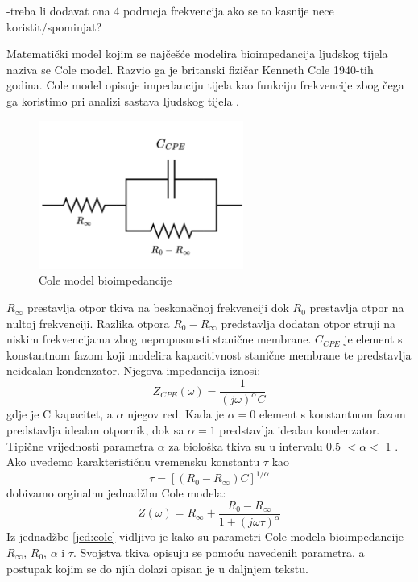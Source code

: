 \documentclass[../diplomski_rad.tex]{subfiles}
\begin{document}
-treba li dodavat ona 4 podrucja frekvencija ako se to kasnije nece koristit/spominjat?

Matematički model kojim se najčešće modelira bioimpedancija ljudskog tijela naziva se Cole model. 
Razvio ga je britanski fizičar Kenneth Cole 1940-tih godina. 
Cole model opisuje impedanciju tijela kao funkciju frekvencije zbog čega ga koristimo pri analizi sastava ljudskog tijela \cite{Freeborn2021}.
\begin{figure}[htb]
    \centering
    \includegraphics[width=0.6\textwidth]{Figures/cole_model.png} 
    \caption{Cole model bioimpedancije}
    \label{slk:cole_model}
\end{figure}
$R_{\infty}$ prestavlja otpor tkiva na beskonačnoj frekvenciji dok $R_{0}$ prestavlja otpor na nultoj frekvenciji. 
Razlika otpora $R_{0}-R_{\infty}$ predstavlja dodatan otpor struji na niskim frekvencijama zbog nepropusnosti stanične membrane. 
$C_{CPE}$ je element s konstantnom fazom koji modelira kapacitivnost stanične membrane 
te predstavlja neidealan kondenzator. Njegova impedancija iznosi: 
\begin{equation}
    \label{jed:cpe}
    Z_{CPE}(\omega) = \frac{1}{(j\omega)^{\alpha}C}
\end{equation} 
gdje je C kapacitet, a $\alpha$ njegov red. Kada je $\alpha = 0$ element s konstantnom fazom predstavlja idealan otpornik, 
dok sa $\alpha = 1$ predstavlja idealan kondenzator. 
Tipične vrijednosti parametra $\alpha$ za biološka tkiva su u intervalu 0.5 $< \alpha <$ 1 \cite{Freeborn2021}.
Ako uvedemo karakterističnu vremensku konstantu $\tau$ kao
\begin{equation}
    \label{jed:time_const}
    \tau = [(R_{0}-R_{\infty})C]^{1/\alpha}
\end{equation}
dobivamo orginalnu jednadžbu Cole modela: 
\begin{equation}
    \label{jed:cole}
    Z(\omega) = R_{\infty}+\frac{R_{0}-R_{\infty}}{1+(j\omega\tau)^{\alpha}} 
\end{equation} 
Iz jednadžbe \ref{jed:cole} vidljivo je kako su parametri Cole modela bioimpedancije 
$R_{\infty}$, $R_{0}$, $\alpha$ i $\tau$. 
Svojstva tkiva opisuju se pomoću navedenih parametra, a postupak kojim se do njih dolazi opisan je u daljnjem tekstu.
\end{document}
